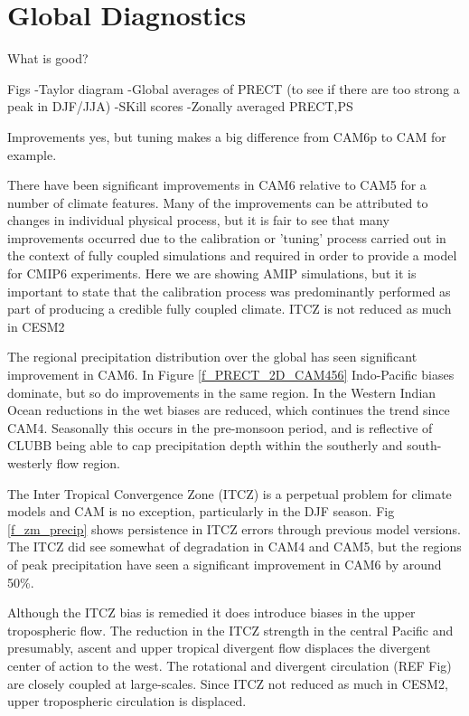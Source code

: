 \section{Global Diagnostics}
\label{sec:climate}
What is good?

Figs
-Taylor diagram
-Global averages of PRECT (to see if there are too strong a peak in DJF/JJA)
-SKill scores
-Zonally averaged PRECT,PS

Improvements yes, but tuning makes a big difference from CAM6p to CAM for example.

There have been significant improvements in CAM6 relative to CAM5 for a number of climate features. Many of the improvements can be attributed to changes in individual physical process, but it is fair to see that many improvements occurred due to the calibration or 'tuning' process carried out in the context of fully coupled simulations and required in order to provide a model for CMIP6 experiments. Here we are showing AMIP simulations, but it is important to state that the calibration process was predominantly performed as part of producing a credible fully coupled climate. 
ITCZ is not reduced as much in CESM2

The regional precipitation distribution over the global has seen significant improvement in CAM6. In Figure \ref{f_PRECT_2D_CAM456} Indo-Pacific biases dominate, but so do improvements in the same region. In the Western Indian Ocean reductions in the wet biases are reduced, which continues the trend since CAM4. Seasonally this occurs in the pre-monsoon period, and is reflective of CLUBB being able to cap precipitation depth within the southerly and south-westerly flow region.

The Inter Tropical Convergence Zone (ITCZ) is a perpetual problem for climate models and CAM is no exception, particularly in the DJF season. Fig \ref{f_zm_precip} shows persistence in ITCZ errors through previous model versions. The ITCZ did see somewhat of degradation in CAM4 and CAM5, but the regions of peak precipitation have seen a significant improvement in CAM6 by around 50\%. 

Although the ITCZ bias is remedied it does introduce biases in the upper tropospheric flow. The reduction in the ITCZ strength in the central Pacific and presumably, ascent and upper tropical divergent flow displaces the divergent center of action to the west. The rotational and divergent circulation (REF Fig) are closely coupled at large-scales. Since ITCZ not reduced as much in CESM2, upper tropospheric circulation is displaced.

